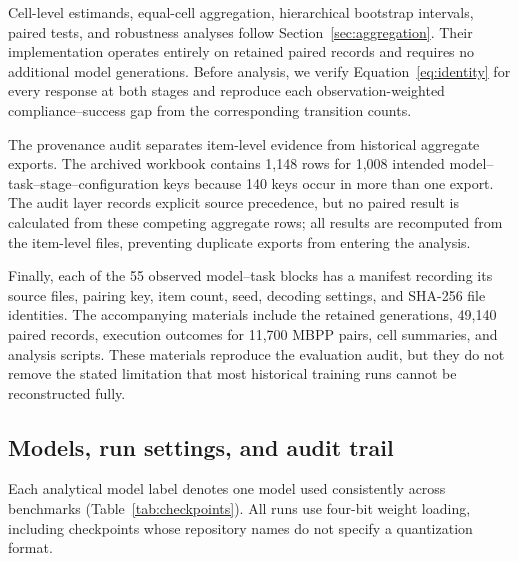 \documentclass{article}
\begin{document}
Cell-level estimands, equal-cell aggregation, hierarchical bootstrap intervals, paired tests, and robustness analyses follow Section~\ref{sec:aggregation}. Their implementation operates entirely on retained paired records and requires no additional model generations. Before analysis, we verify Equation~\eqref{eq:identity} for every response at both stages and reproduce each observation-weighted compliance--success gap from the corresponding transition counts.

The provenance audit separates item-level evidence from historical aggregate exports. The archived workbook contains 1,148 rows for 1,008 intended model--task--stage--configuration keys because 140 keys occur in more than one export. The audit layer records explicit source precedence, but no paired result is calculated from these competing aggregate rows; all results are recomputed from the item-level files, preventing duplicate exports from entering the analysis.

Finally, each of the 55 observed model--task blocks has a manifest recording its source files, pairing key, item count, seed, decoding settings, and SHA-256 file identities. The accompanying materials include the retained generations, 49,140 paired records, execution outcomes for 11,700 MBPP pairs, cell summaries, and analysis scripts. These materials reproduce the evaluation audit, but they do not remove the stated limitation that most historical training runs cannot be reconstructed fully.

\subsection{Models, run settings, and audit trail}
\label{app:checkpoints}
Each analytical model label denotes one model used consistently across
benchmarks (Table~\ref{tab:checkpoints}). All runs use four-bit weight loading,
including checkpoints whose repository names do not specify a quantization
format.
\end{document}
